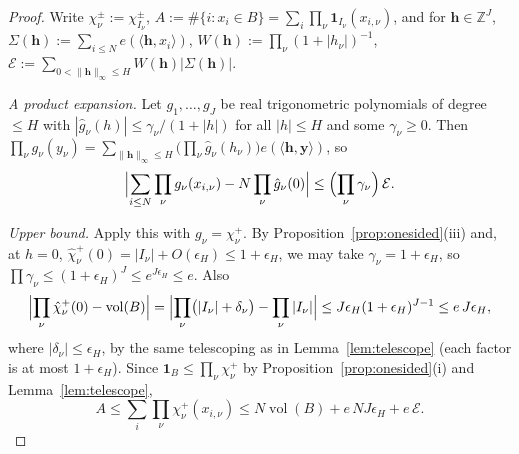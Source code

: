\documentclass[11pt]{article}
\theoremstyle{definition}
\theoremstyle{plain}
\begin{document}
\begin{proof}
Write $\chi^{\pm}_{\nu}:=\chi^{\pm}_{I_{\nu}}$,
$A:=\#\{i:x_{i}\in B\}=\sum_{i}\prod_{\nu}\mathbf 1_{I_{\nu}}(x_{i,\nu})$,
and for $\mathbf h\in\mathbb Z^{J}$,
$\Sigma(\mathbf h):=\sum_{i\le N}e(\langle\mathbf h,x_{i}\rangle)$,
$W(\mathbf h):=\prod_{\nu}(1+|h_{\nu}|)^{-1}$,
$\mathcal E:=\sum_{0<\|\mathbf h\|_{\infty}\le H}W(\mathbf h)|\Sigma(\mathbf h)|$.

\emph{A product expansion.}  Let $g_{1},\dots,g_{J}$ be real
trigonometric polynomials of degree $\le H$ with
$|\hat g_{\nu}(h)|\le\gamma_{\nu}/(1+|h|)$ for all $|h|\le H$ and some
$\gamma_{\nu}\ge0$.  Then
$\prod_{\nu}g_{\nu}(y_{\nu})
=\sum_{\|\mathbf h\|_{\infty}\le H}\bigl(\prod_{\nu}\hat g_{\nu}(h_{\nu})
\bigr)e(\langle\mathbf h,\mathbf y\rangle)$, so
\begin{equation}\label{eq:expand}
\Bigl|\sum_{i\le N}\prod_{\nu}g_{\nu}(x_{i,\nu})
-N\prod_{\nu}\hat g_{\nu}(0)\Bigr|
\le\Bigl(\prod_{\nu}\gamma_{\nu}\Bigr)\,\mathcal E .
\end{equation}

\emph{Upper bound.}  Apply this with $g_{\nu}=\chi^{+}_{\nu}$.  By
Proposition~\ref{prop:onesided}(iii) and, at $h=0$,
$\hat\chi^{+}_{\nu}(0)=|I_{\nu}|+O(\epsilon_{H})\le1+\epsilon_{H}$, we may
take $\gamma_{\nu}=1+\epsilon_{H}$, so
$\prod\gamma_{\nu}\le(1+\epsilon_{H})^{J}\le e^{J\epsilon_{H}}\le e$.
Also
\[
\Bigl|\prod_{\nu}\hat\chi^{+}_{\nu}(0)-\operatorname{vol}(B)\Bigr|
=\Bigl|\prod_{\nu}\bigl(|I_{\nu}|+\delta_{\nu}\bigr)
-\prod_{\nu}|I_{\nu}|\Bigr|
\le J\epsilon_{H}(1+\epsilon_{H})^{J-1}\le e\,J\epsilon_{H},
\]
where $|\delta_{\nu}|\le\epsilon_{H}$, by the same telescoping as in
Lemma~\ref{lem:telescope} (each factor is at most $1+\epsilon_{H}$).
Since $\mathbf 1_{B}\le\prod_{\nu}\chi^{+}_{\nu}$ by
Proposition~\ref{prop:onesided}(i) and Lemma~\ref{lem:telescope},
\[
A\le\sum_{i}\prod_{\nu}\chi^{+}_{\nu}(x_{i,\nu})
\le N\operatorname{vol}(B)+e\,NJ\epsilon_{H}+e\,\mathcal E .
\]


\end{proof}
\end{document}
